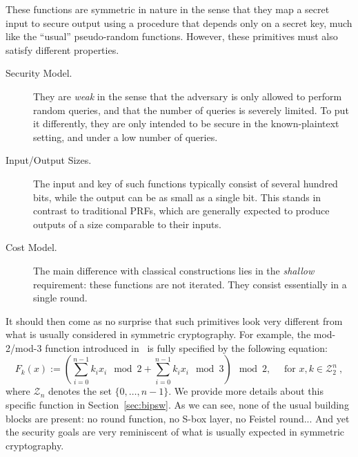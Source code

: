 \documentclass[journal=tosc,submission]{iacrtrans}
\theoremstyle{theorem}
\newcommand\Z{\mathcal{Z}}
\begin{document}

These functions are symmetric in nature in the sense that they map a secret input to secure output using a procedure that depends only on a secret key, much like the ``usual'' pseudo-random functions. However, these primitives must also satisfy different properties.
\begin{description}
\item[Security Model.] They are \emph{weak} in the sense that the adversary is only allowed to perform random queries, and that the number of queries is severely limited. To put it differently, they are only intended to be secure in the known-plaintext setting, and under a low number of queries.
\item[Input/Output Sizes.] The input and key of such functions typically consist of several hundred bits, while the output can be as small as a single bit. This stands in contrast to traditional PRFs, which are generally expected to produce outputs of a size comparable to their inputs.
\item[Cost Model.] The main difference with classical constructions lies in the \emph{shallow} requirement: these functions are not iterated. They consist essentially in a single round.
\end{description}
It should then come as no surprise that such primitives look very different from what is usually considered in symmetric cryptography. For example, the mod-2/mod-3 function introduced in~\cite{TCC:BIPSW18} is fully specified by the following equation:
\begin{equation*}
  F_k(x) := \left(\sum_{i = 0}^{n-1} k_i x_i \mod 2 + \sum_{i = 0}^{n-1} k_i x_i \mod 3\right) \mod{2}, \quad \text{ for } x,k \in \Z_2^n~,
\end{equation*}
where $\Z_n$ denotes the set $\{0,\dots,n-1\}$. We provide more details about this specific function in Section~\ref{sec:bipsw}. As we can see, none of the usual building blocks are present: no round function, no S-box layer, no Feistel round... And yet the security goals are very reminiscent of what is usually expected in symmetric cryptography.
\end{document}

